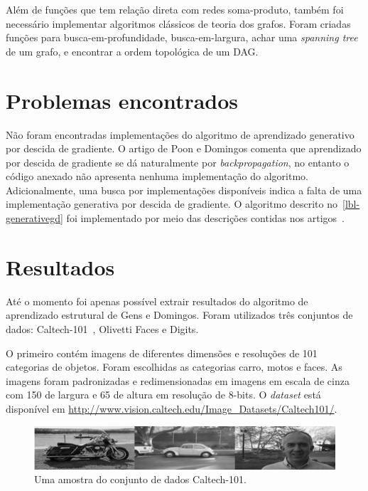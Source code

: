 \documentclass[12pt]{article}
\theoremstyle{plain}
\numberwithin{equation}{section}
\begin{document}
Além de funções que tem relação direta com redes soma-produto, também foi necessário implementar
algoritmos clássicos de teoria dos grafos. Foram criadas funções para busca-em-profundidade,
busca-em-largura, achar uma \textit{spanning tree} de um grafo, e encontrar a ordem topológica de
um DAG\@.

\section{Problemas encontrados}

Não foram encontradas implementações do algoritmo de aprendizado generativo por descida de
gradiente. O artigo de Poon e Domingos comenta que aprendizado por descida de gradiente se dá
naturalmente por \textit{backpropagation}\cite{poon-domingo}, no entanto o código anexado não
apresenta nenhuma implementação do algoritmo. Adicionalmente, uma busca por implementações
disponíveis indica a falta de uma implementação generativa por descida de gradiente. O algoritmo
descrito no~\autoref{lbl-generativegd} foi implementado por meio das descrições contidas
nos artigos~\cite{poon-domingos,discriminative}.

\section{Resultados}

Até o momento foi apenas possível extrair resultados do algoritmo de aprendizado estrutural de Gens
e Domingos. Foram utilizados três conjuntos de dados: Caltech-101~\cite{caltech}, Olivetti Faces e
Digits.

O primeiro contém imagens de diferentes dimensões e resoluções de 101 categorias de
objetos. Foram escolhidas as categorias carro, motos e faces. As imagens foram padronizadas e
redimensionadas em imagens em escala de cinza com 150 de largura e 65 de altura em resolução de
8-bits. O \textit{dataset} está disponível em
\url{http://www.vision.caltech.edu/Image_Datasets/Caltech101/}.

\begin{figure}[h]
  \centering\includegraphics[scale=1.0]{imgs/caltech_sample.png}
  \caption{Uma amostra do conjunto de dados Caltech-101.}
\end{figure}
\end{document}
